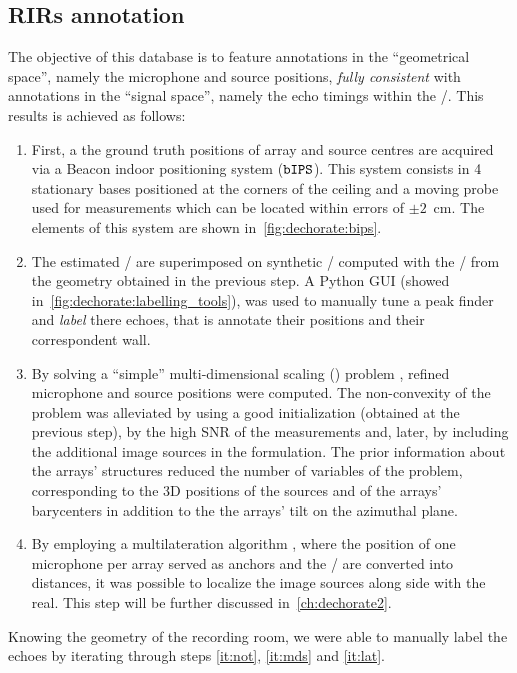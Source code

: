 \subsection{RIRs annotation}
The objective of this database is to feature annotations in the ``geometrical space'', namely the microphone and source positions, \textit{fully consistent} with annotations in the ``signal space'', namely the echo timings within the \RIRs/.
This results is achieved as follows:
\begin{enumerate}[label=(\roman*)]
    \item \label{it:ips} First, a the ground truth positions of array and source centres are acquired via a Beacon indoor positioning system ($\mathtt{bIPS}$).
    This system consists in 4 stationary bases positioned at the corners of the ceiling and a moving probe used for measurements which can be located within errors of $\pm2$~cm.
    The elements of this system are shown in~\cref{fig:dechorate:bips}.
    \item \label{it:not} The estimated \RIRs/ are superimposed on synthetic \RIRs/ computed with the \ISM/ from the geometry obtained in the previous step.
    A Python GUI (showed in~\cref{fig:dechorate:labelling_tools}), was used to manually tune a peak finder and \textit{label} there echoes, that is annotate their positions and their correspondent wall.

    \item \label{it:mds} By solving a ``simple'' multi-dimensional scaling (\MDS) problem , refined microphone and source positions were computed.
    The non-convexity of the problem was alleviated by using a good initialization (obtained at the previous step), by the high SNR of the measurements and, later, by including the additional image sources in the formulation.
    The prior information about the arrays' structures reduced the number of variables of the problem, corresponding to the 3D positions of the sources and of the arrays' barycenters in addition to the the arrays' tilt on the azimuthal plane.

    \item \label{it:lat} By employing a multilateration algorithm , where the position of one microphone per array served as anchors and the \TOAs/ are converted into distances, it was possible to localize the image sources along side with the real.
    This step will be further discussed in~\cref{ch:dechorate2}.
\end{enumerate}
Knowing the geometry of the recording room, we were able to manually label the echoes by iterating through steps \ref{it:not}, \ref{it:mds} and \ref{it:lat}.

